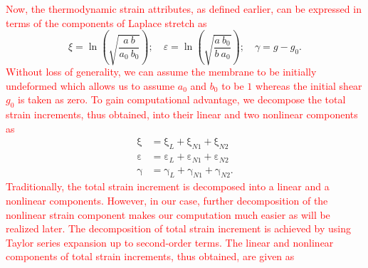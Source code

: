 \textcolor{red}{Now, the thermodynamic strain attributes, as defined earlier, can be expressed in terms of the components of Laplace stretch as}
\begin{equation}
\xi=\ln\left(\sqrt{\dfrac{a\:b}{a_0\:b_0}}\right);\quad\varepsilon=\ln\left(\sqrt{\dfrac{a\:b_0}{b\:a_0}}\right);\quad \gamma=g-g_0.
\end{equation}
\textcolor{red}{Without loss of generality, we can assume the membrane to be initially undeformed which allows us to assume $a_0$ and $b_0$ to be $1$ whereas the initial shear $g_0$ is taken as zero. To gain computational advantage, we decompose the total strain increments, thus obtained, into their linear and two nonlinear components as}
\begin{subequations}
	\begin{align}
	\mathrm  \xi & = \mathrm \xi_{L} + \mathrm  \xi_{N1} + \mathrm  \xi_{N2}\\
	\mathrm  \varepsilon & = \mathrm  \varepsilon_{L} + \mathrm  \varepsilon_{N1} + \mathrm  \varepsilon_{N2}\\
	\mathrm \gamma & = \mathrm  \gamma_{L} + \mathrm  \gamma_{N1} + \mathrm  \gamma_{N2}.
	\end{align}
	\label{totalvirtualstrain}
\end{subequations}
\textcolor{red}{Traditionally, the total strain increment is decomposed into a linear and a nonlinear components. However, in our case, further decomposition of the nonlinear strain component makes our computation much easier as will be realized later. The decomposition of total strain increment is achieved by using Taylor series expansion up to second-order terms. The linear and nonlinear components of total strain increments, thus obtained, are given as}
